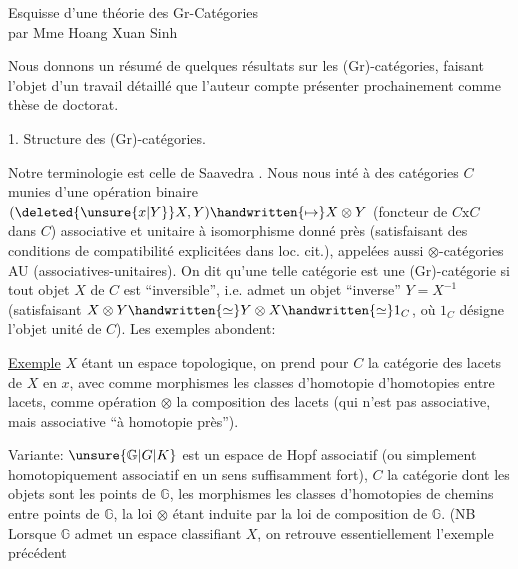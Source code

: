 
\begin{center}
Esquisse d'une théorie des Gr-Catégories\\
par Mme Hoang Xuan Sinh
\end{center}

Nous donnons un résumé de quelques résultats sur les (Gr)-catégories, faisant l'objet d'un travail détaillé que l'auteur compte présenter prochainement comme thèse de doctorat\handwritten{[\, ]}.

1. Structure des (Gr)-catégories.

Notre terminologie est celle de Saavedra \handwritten{[\, ]}. Nous nous inté à des catégories $C$ munies d'une opération binaire $(\deleted{\unsure{x|Y}}X,Y)\handwritten{\mapsto}X\otimes Y$ (foncteur de $C\mathbin{\mathrm{x}}C$ dans $C$) associative et unitaire à isomorphisme donné près (satisfaisant des conditions de compatibilité explicitées dans loc. cit.), appelées aussi $\otimes$-catégories AU (associatives-unitaires). On dit qu'une telle catégorie est une (Gr)-catégorie si  tout objet $X$ de $C$ est ``inversible'', i.e. admet un objet ``inverse'' $Y=X^{-1}$ (satisfaisant $X\otimes Y\handwritten{\simeq}Y\otimes X\handwritten{\simeq}1_C$, où $1_C$ désigne l'objet unité de $C$). Les exemples abondent:

\uline{Exemple}  $X$ étant un espace topologique, on prend pour $C$ la catégorie des lacets de $X$ en $x$, avec comme morphismes les classes d'homotopie d'homotopies entre lacets, comme opération $\otimes$ la composition des lacets (qui n'est pas associative, mais associative ``à homotopie près'').

Variante: $\unsure{\mathbb{G}|G|K}$ est un espace de Hopf associatif (ou simplement homotopiquement associatif en un sens suffisamment fort), $C$ la catégorie dont les objets sont les points de $\mathbb{G}$, les morphismes les classes d'homotopies de chemins entre points de $\mathbb{G}$, la loi $\otimes$ étant induite par la loi de composition de $\mathbb{G}$. (NB Lorsque $\mathbb{G}$ admet un espace classifiant $X$, on retrouve essentiellement l'exemple précédent


